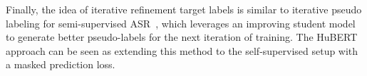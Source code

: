 Finally, the idea of iterative refinement target labels is similar to iterative pseudo labeling for semi-supervised ASR~\cite{xu2020iterative, likhomanenko2020slimipl}, which leverages an improving student model to generate better pseudo-labels for the next iteration of training. The HuBERT approach can be seen as extending this method to the self-supervised setup with a masked prediction loss.